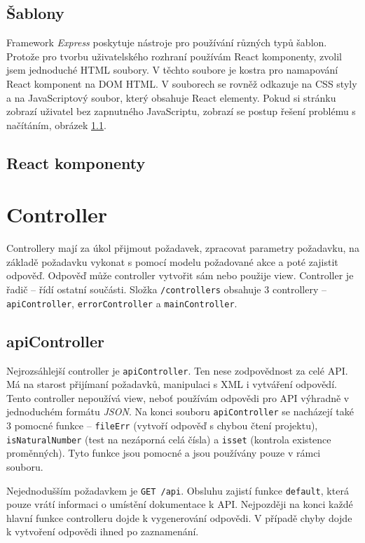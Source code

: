 \subsection{Šablony}
Framework \textit{Express} poskytuje nástroje pro používání různých typů šablon. Protože pro tvorbu uživatelského rozhraní používám React komponenty, zvolil jsem jednoduché HTML soubory. V těchto soubore je kostra pro namapování React komponent na DOM HTML. V souborech se rovněž odkazuje na CSS styly a na JavaScriptový soubor, který obsahuje React elementy. Pokud si stránku zobrazí uživatel bez zapnutného JavaScriptu, zobrazí se postup řešení problému s načítáním, obrázek \ref{}.


\subsection{React komponenty}

\section{Controller}
Controllery mají za úkol přijmout požadavek, zpracovat parametry požadavku, na základě požadavku vykonat s pomocí modelu požadované akce a poté zajistit odpověď. Odpověď může controller vytvořit sám nebo použije view. Controller je řadič -- řídí ostatní součásti. Složka \texttt{/controllers} obsahuje 3 controllery -- \texttt{apiController}, \texttt{errorController} a \texttt{mainController}.

\subsection{apiController}
Nejrozsáhlejší controller je \texttt{apiController}. Ten nese zodpovědnost za celé API. Má na starost přijímaní požadavků, manipulaci s XML i vytváření odpovědí. Tento controller nepoužívá view, neboť používám odpovědi pro API výhradně v jednoduchém formátu \textit{JSON}. Na konci souboru \texttt{apiController} se nacházejí také 3 pomocné funkce -- \texttt{fileErr} (vytvoří odpověď s chybou čtení projektu), \texttt{isNaturalNumber} (test na nezáporná celá čísla) a \texttt{isset} (kontrola existence proměnných). Tyto funkce jsou pomocné a jsou používány pouze v rámci souboru.

Nejednodušším požadavkem je \texttt{GET /api}. Obsluhu zajistí funkce \texttt{default}, která pouze vrátí informaci o umístění dokumentace k API. Nejpozději na konci každé hlavní funkce controlleru dojde k vygenerování odpovědi. V případě chyby dojde k vytvoření odpovědi ihned po zaznamenání.

